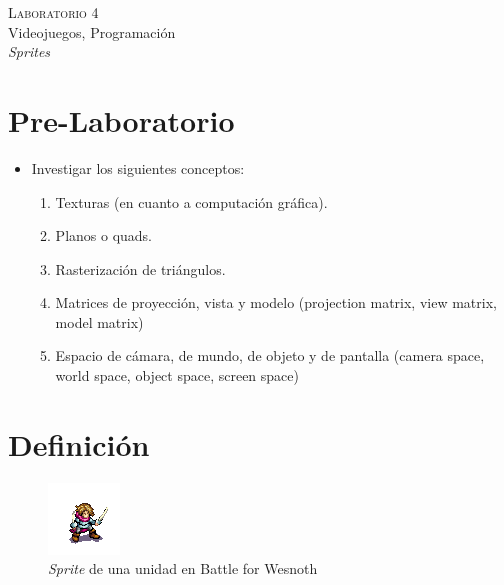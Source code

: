 \begin{center}
\textsc{\Large Laboratorio 4}~\\
{\large Videojuegos, Programación}~\\
\emph{Sprites}
\end{center}

\section{Pre-Laboratorio}
\begin{itemize}
\item Investigar los siguientes conceptos:
\begin{enumerate}
  \item Texturas (en cuanto a computación gráfica).
  \item Planos o quads.
  \item Rasterización de triángulos.
  \item Matrices de proyección, vista y modelo (projection matrix, view matrix, model matrix)
  \item Espacio de cámara, de mundo, de objeto y de pantalla (camera space, world space, object space, screen space)
\end{enumerate}
\end{itemize}
\section{Definición}
\setlength\intextsep{0pt}
\begin{figure}
\includegraphics[width=\linewidth]{media/sprite_ej1.png} 
\caption{\emph{Sprite} de una unidad en Battle for Wesnoth \cite{wesnothgame}}
\end{figure}

